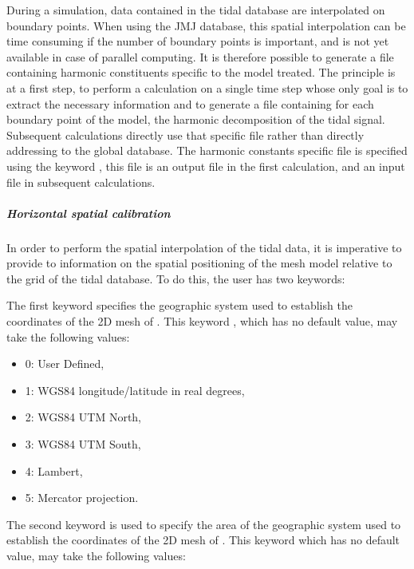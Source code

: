 During a simulation, data contained in the tidal database are interpolated
on boundary points.
When using the JMJ database, this spatial interpolation can be time consuming
if the number of boundary points is important, and is not yet available in case
of parallel computing.
It is therefore possible to generate a file containing harmonic constituents
specific to the model treated.
The principle is at a first step, to perform a calculation on a single time step
whose only goal is to extract the necessary information and to generate a file
containing for each boundary point of the model, the harmonic decomposition of
the tidal signal.
Subsequent calculations directly use that specific file rather than directly
addressing to the global database.
The harmonic constants specific file is specified using the keyword
, this file is an output file in the first
calculation, and an input file in subsequent calculations.


\subparagraph{Horizontal spatial calibration}

In order to perform the spatial interpolation of the tidal data,
it is imperative to provide to  information on the spatial
positioning of the mesh model relative to the grid of the tidal database.
To do this, the user has two keywords:

The first keyword specifies the geographic system used to establish the
coordinates of the 2D mesh of .
This keyword , which has no default value,
may take the following values:

\begin{itemize}
\item 0: User Defined,

\item 1: WGS84 longitude/latitude in real degrees,

\item 2: WGS84 UTM North,

\item 3: WGS84 UTM South,

\item 4: Lambert,

\item 5: Mercator projection.
\end{itemize}

The second keyword is used to specify the area of the geographic system used
to establish the coordinates of the 2D mesh of .
This keyword  which has no default
value, may take the following values:

